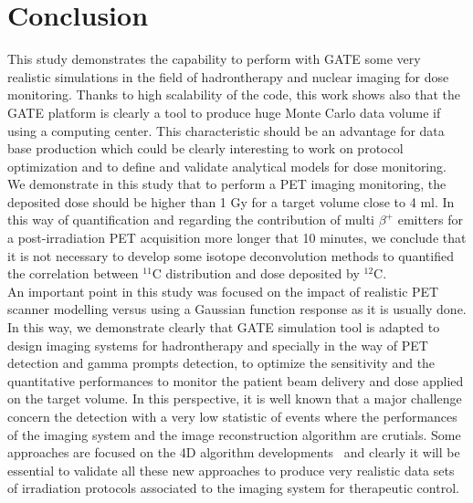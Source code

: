\documentclass[11pt]{iopart}
\begin{document}
\section{Conclusion}

This study demonstrates the capability to perform with GATE some very realistic simulations in the field of hadrontherapy and nuclear imaging for dose monitoring. Thanks to high scalability of the code, this work shows also that the GATE platform is clearly a tool to produce huge Monte Carlo data volume if using a computing center. This characteristic should be an advantage for data base production which could be clearly interesting to work on protocol optimization and to define and validate analytical models for dose monitoring. We demonstrate in this study that to perform a PET imaging monitoring, the deposited dose should be higher than 1 Gy for a target volume close to 4 ml. In this way of quantification and regarding the contribution of multi $\beta^+$ emitters for a post-irradiation PET acquisition more longer that 10 minutes, we conclude that it is not necessary to develop some isotope deconvolution methods to quantified the correlation between $^{11}$C distribution and dose deposited by $^{12}$C.\\
An important point in this study was focused on the impact of realistic PET scanner modelling versus using a Gaussian function response as it is usually done. In this way, we demonstrate clearly that GATE simulation tool is adapted to design imaging systems for hadrontherapy and specially in the way of PET detection and gamma prompts detection, to optimize the sensitivity and the quantitative performances to monitor the patient beam delivery and dose applied on the target volume. In this perspective, it is well known that a major challenge concern the detection with a very low statistic of events where the performances of the imaging system and the image reconstruction algorithm are crutials. Some approaches are focused on the 4D algorithm developments~\cite{bib:Fall2011} and clearly it will be essential to validate all these new approaches to produce very realistic data sets of irradiation protocols associated to the imaging system for therapeutic control.  



%

%
%
%

%

\end{document}
